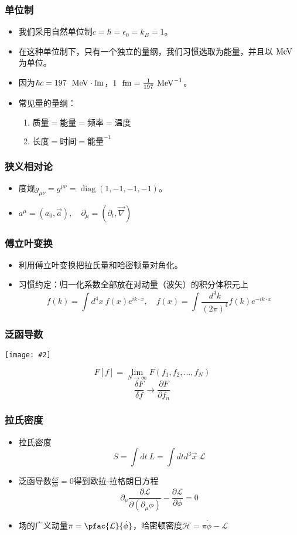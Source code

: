\documentclass[aspectratio=1610,14pt,mathserif]{beamer}
\newcommand{\bch}{}
\newcommand{\ech}{}
\DeclareMathOperator{\diag}{diag}
\newcommand{\lag}{\mathcal{L}}
\newcommand{\unit}[1]{\ {{\rm \ #1}}}
\newcommand{\mev}{\ {\rm MeV}}
\newcommand{\pfrac}[2]{\frac{\partial #1}{\partial #2}}
\newcommand{\cpic}[2]{
\begin{center}
\texttt{[image: \#2]}
\end{center}
}
\begin{document}
\begin{frame}
\frametitle{\bch 单位制 \ech}
\bch
\begin{itemize}
\item 我们采用自然单位制$c = \hbar = \epsilon_0 = k_B = 1$。
\item 在这种单位制下，只有一个独立的量纲，我们习惯选取为能量，并且以$\mev$为单位。
\item 因为$\hbar c = 197\unit{MeV\cdot fm}$，$1\unit{fm} = \frac{1}{197} \mev^{-1}$。
\item 常见量的量纲：
\begin{enumerate}
\item $\text{质量} = \text{能量} = \text{频率} = \text{温度}$
\item $\text{长度} = \text{时间} = \text{能量}^{-1}$
\end{enumerate}
\end{itemize}
\ech
\end{frame}

\begin{frame}
\frametitle{\bch 狭义相对论 \ech}
\bch
\begin{itemize}
\item 度规$g_{\mu \nu} = g^{\mu \nu} = \diag(1,-1,-1,-1)$。
\item $a^\mu = (a_0,\vec a),\quad \partial_\mu = (\partial_t,\vec \nabla)$
\end{itemize}
\ech
\end{frame}

\begin{frame}
\frametitle{\bch 傅立叶变换 \ech}
\bch
\begin{itemize}
\item 利用傅立叶变换把拉氏量和哈密顿量对角化。
\item 习惯约定：归一化系数全部放在对动量（波矢）的积分体积元上
$$f(k) = \int d^4 x\ f(x) e^{ik\cdot x},\quad f(x) = \int \frac{d^4 k}{(2\pi)^4} f(k) e^{-ik\cdot x}$$
\end{itemize}
\ech
\end{frame}

\begin{frame}
\frametitle{\bch 泛函导数 \ech}
\bch
\cpic{0.4}{func}
$$ F[f] = \lim_{N\to \infty} F(f_1,f_2,\dots,f_N)$$
$$ \frac{\delta F}{\delta f} \to \pfrac{F}{f_n}$$
\ech
\end{frame}

\begin{frame}
\frametitle{\bch 拉氏密度 \ech}
\bch
\begin{itemize}
\item 拉氏密度
$$S = \int dt \ L = \int dt d^3 \vec x \ \lag$$
\item
泛函导数$\frac{\delta S}{\delta \phi} = 0$得到欧拉-拉格朗日方程
$$
\partial_\mu \pfrac{\lag}{(\partial_\mu \phi)} - \pfrac{\lag}{\phi} = 0
$$
\item 场的广义动量$\pi = \pfac{\lag}{\dot{\phi}}$，哈密顿密度$\mathcal{H} =  \pi \dot{\phi}- \lag$
\end{itemize}
\ech
\end{frame}
\end{document}

